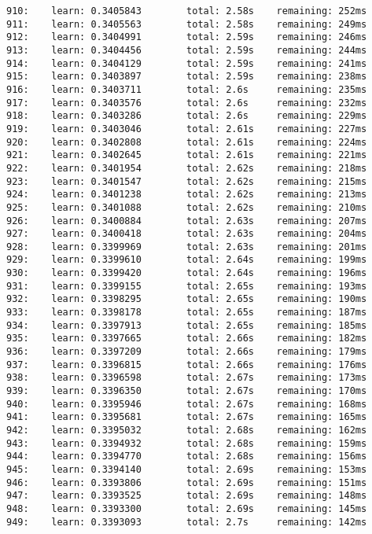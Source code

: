 \documentclass[11pt]{article}
\begin{document}
\begin{Verbatim}[commandchars=\\\{\}]
910:    learn: 0.3405843        total: 2.58s    remaining: 252ms
911:    learn: 0.3405563        total: 2.58s    remaining: 249ms
912:    learn: 0.3404991        total: 2.59s    remaining: 246ms
913:    learn: 0.3404456        total: 2.59s    remaining: 244ms
914:    learn: 0.3404129        total: 2.59s    remaining: 241ms
915:    learn: 0.3403897        total: 2.59s    remaining: 238ms
916:    learn: 0.3403711        total: 2.6s     remaining: 235ms
917:    learn: 0.3403576        total: 2.6s     remaining: 232ms
918:    learn: 0.3403286        total: 2.6s     remaining: 229ms
919:    learn: 0.3403046        total: 2.61s    remaining: 227ms
920:    learn: 0.3402808        total: 2.61s    remaining: 224ms
921:    learn: 0.3402645        total: 2.61s    remaining: 221ms
922:    learn: 0.3401954        total: 2.62s    remaining: 218ms
923:    learn: 0.3401547        total: 2.62s    remaining: 215ms
924:    learn: 0.3401238        total: 2.62s    remaining: 213ms
925:    learn: 0.3401088        total: 2.62s    remaining: 210ms
926:    learn: 0.3400884        total: 2.63s    remaining: 207ms
927:    learn: 0.3400418        total: 2.63s    remaining: 204ms
928:    learn: 0.3399969        total: 2.63s    remaining: 201ms
929:    learn: 0.3399610        total: 2.64s    remaining: 199ms
930:    learn: 0.3399420        total: 2.64s    remaining: 196ms
931:    learn: 0.3399155        total: 2.65s    remaining: 193ms
932:    learn: 0.3398295        total: 2.65s    remaining: 190ms
933:    learn: 0.3398178        total: 2.65s    remaining: 187ms
934:    learn: 0.3397913        total: 2.65s    remaining: 185ms
935:    learn: 0.3397665        total: 2.66s    remaining: 182ms
936:    learn: 0.3397209        total: 2.66s    remaining: 179ms
937:    learn: 0.3396815        total: 2.66s    remaining: 176ms
938:    learn: 0.3396598        total: 2.67s    remaining: 173ms
939:    learn: 0.3396350        total: 2.67s    remaining: 170ms
940:    learn: 0.3395946        total: 2.67s    remaining: 168ms
941:    learn: 0.3395681        total: 2.67s    remaining: 165ms
942:    learn: 0.3395032        total: 2.68s    remaining: 162ms
943:    learn: 0.3394932        total: 2.68s    remaining: 159ms
944:    learn: 0.3394770        total: 2.68s    remaining: 156ms
945:    learn: 0.3394140        total: 2.69s    remaining: 153ms
946:    learn: 0.3393806        total: 2.69s    remaining: 151ms
947:    learn: 0.3393525        total: 2.69s    remaining: 148ms
948:    learn: 0.3393300        total: 2.69s    remaining: 145ms
949:    learn: 0.3393093        total: 2.7s     remaining: 142ms

\end{Verbatim}
\end{document}
